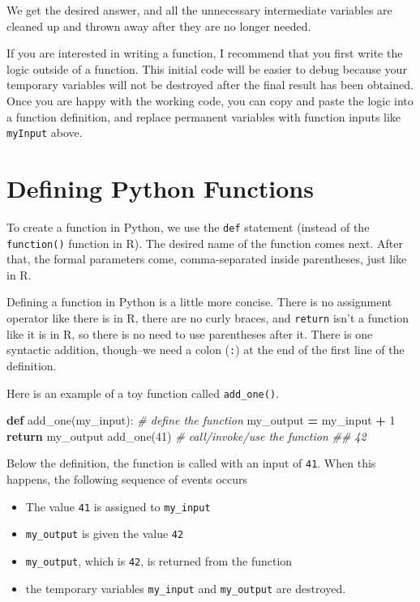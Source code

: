 \documentclass[
  12pt,
]{krantz}
\makeatletter
\newenvironment{Shaded}{\begin{snugshade}}{\end{snugshade}}
\newcommand{\CommentTok}[1]{\textcolor[rgb]{0.37,0.37,0.37}{\textit{#1}}}
\newcommand{\ControlFlowTok}[1]{\textcolor[rgb]{0.27,0.27,0.27}{\textbf{#1}}}
\newcommand{\DecValTok}[1]{\textcolor[rgb]{0.06,0.06,0.06}{#1}}
\newcommand{\KeywordTok}[1]{\textcolor[rgb]{0.27,0.27,0.27}{\textbf{#1}}}
\newcommand{\NormalTok}[1]{#1}
\newcommand{\OperatorTok}[1]{\textcolor[rgb]{0.43,0.43,0.43}{\textbf{#1}}}
\providecommand{\tightlist}{%
  \setlength{\itemsep}{0pt}\setlength{\parskip}{0pt}}
\newenvironment{kframe}{%
\medskip{}
\setlength{\fboxsep}{.8em}
 \def\at@end@of@kframe{}%
 \ifinner\ifhmode%
  \def\at@end@of@kframe{\end{minipage}}%
  \begin{minipage}{\columnwidth}%
 \fi\fi%
 \def\FrameCommand##1{\hskip\@totalleftmargin \hskip-\fboxsep
 \colorbox{shadecolor}{##1}\hskip-\fboxsep
     \hskip-\linewidth \hskip-\@totalleftmargin \hskip\columnwidth}%
 \MakeFramed {\advance\hsize-\width
   \@totalleftmargin\z@ \linewidth\hsize
   \@setminipage}}%
 {\par\unskip\endMakeFramed%
 \at@end@of@kframe}
\renewenvironment{Shaded}{\begin{kframe}}{\end{kframe}}
\makeatother
\begin{document}
We get the desired answer, and all the unnecessary intermediate variables are cleaned up and thrown away after they are no longer needed.

If you are interested in writing a function, I recommend that you first write the logic outside of a function. This initial code will be easier to debug because your temporary variables will not be destroyed after the final result has been obtained. Once you are happy with the working code, you can copy and paste the logic into a function definition, and replace permanent variables with function inputs like \texttt{myInput} above.

\hypertarget{defining-python-functions}{%
\section{Defining Python Functions}\label{defining-python-functions}}

To create a function in Python, we use the \texttt{def} statement (instead of the \texttt{function()} function in R). The desired name of the function comes next. After that, the formal parameters come, comma-separated inside parentheses, just like in R.

Defining a function in Python is a little more concise. There is no assignment operator like there is in R, there are no curly braces, and \texttt{return} isn't a function like it is in R, so there is no need to use parentheses after it. There is one syntactic addition, though--we need a colon (\texttt{:}) at the end of the first line of the definition.

Here is an example of a toy function called \texttt{add\_one()}.

\begin{Shaded}
\begin{Highlighting}[]
\KeywordTok{def}\NormalTok{ add\_one(my\_input):  }\CommentTok{\# define the function}
\NormalTok{  my\_output }\OperatorTok{=}\NormalTok{ my\_input }\OperatorTok{+} \DecValTok{1}
  \ControlFlowTok{return}\NormalTok{ my\_output}
\NormalTok{add\_one(}\DecValTok{41}\NormalTok{) }\CommentTok{\# call/invoke/use the function }
\CommentTok{\#\# 42}
\end{Highlighting}
\end{Shaded}

Below the definition, the function is called with an input of \texttt{41}. When this happens, the following sequence of events occurs

\begin{itemize}
\tightlist
\item
  The value \texttt{41} is assigned to \texttt{my\_input}
\item
  \texttt{my\_output} is given the value \texttt{42}
\item
  \texttt{my\_output}, which is \texttt{42}, is returned from the function
\item
  the temporary variables \texttt{my\_input} and \texttt{my\_output} are destroyed.
\end{itemize}
\end{document}
